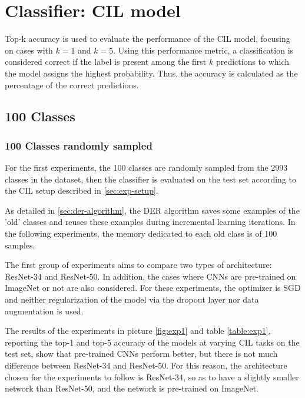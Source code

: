 \section{Classifier: CIL model}
\label{sec:exp-cil}
Top-k accuracy is used to evaluate the performance of the CIL model, focusing on cases with $k=1$ and $k=5$.
Using this performance metric, a classification is considered correct if the label is present among the first $k$ predictions to which the model assigns the highest probability. Thus, the accuracy is calculated as the percentage of the correct predictions.

\subsection{100 Classes}
\subsubsection{100 Classes randomly sampled}
For the first experiments, the 100 classes are randomly sampled from the 2993 classes in the dataset, then the classifier is evaluated on the test set according to the CIL setup described in \autoref{sec:exp-setup}. 

As detailed in \autoref{sec:der-algorithm}, the DER algorithm saves some examples of the 'old' classes and reuses these examples during incremental learning iterations. In the following experiments, the memory dedicated to each old class is of 100 samples.

The first group of experiments aims to compare two types of architecture: ResNet-34 and ResNet-50. In addition, the cases where CNNs are pre-trained on ImageNet or not are also considered. For these experiments, the optimizer is SGD and neither regularization of the model via the dropout layer nor data augmentation is used.

The results of the experiments in picture \autoref{fig:exp1} and table \autoref{table:exp1}, reporting the top-1 and top-5 accuracy of the models at varying CIL tasks on the test set, show that pre-trained CNNs perform better, but there is not much difference between ResNet-34 and ResNet-50. For this reason, the architecture chosen for the experiments to follow is ResNet-34, so as to have a slightly smaller network than ResNet-50, and the network is pre-trained on ImageNet.

